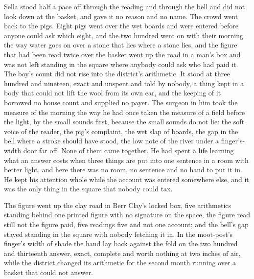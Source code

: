 Sella stood half a pace off through the reading and through the bell and did not look down at the basket, and gave it no reason and no name. The crowd went back to the pigs. Eight pigs went over the wet boards and were entered before anyone could ask which eight, and the two hundred went on with their morning the way water goes on over a stone that lies where a stone lies, and the figure that had been read twice over the basket went up the road in a man's box and was not left standing in the square where anybody could ask who had paid it. The boy's count did not rise into the district's arithmetic. It stood at three hundred and nineteen, exact and unspent and told by nobody, a thing kept in a body that could not lift the wool from its own ear, and the keeping of it borrowed no house count and supplied no payer. The surgeon in him took the measure of the morning the way he had once taken the measure of a field before the light, by the small sounds first, because the small sounds do not lie: the soft voice of the reader, the pig's complaint, the wet slap of boards, the gap in the bell where a stroke should have stood, the low note of the river under a finger's-width door far off. None of them came together. He had spent a life learning what an answer costs when three things are put into one sentence in a room with better light, and here there was no room, no sentence and no hand to put it in. He kept his attention whole while the account was entered somewhere else, and it was the only thing in the square that nobody could tax.

The figure went up the clay road in Berr Clay's locked box, five arithmetics standing behind one printed figure with no signature on the space, the figure read still not the figure paid, five readings five and not one account; and the bell's gap stayed standing in the square with nobody fetching it in. In the moot-post's finger's width of shade the hand lay back against the fold on the two hundred and thirteenth answer, exact, complete and worth nothing at two inches of air, while the district changed its arithmetic for the second month running over a basket that could not answer.
